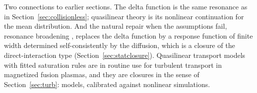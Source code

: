 Two connections to earlier sections. The delta function is the same
resonance as in Section~\ref{sec:collisionless}; quasilinear theory is its
nonlinear continuation for the mean distribution. And the natural repair
when the assumptions fail, resonance broadening \cite{Dupree66}, replaces
the delta function by a response function of finite width determined
self-consistently by the diffusion, which is a closure of the
direct-interaction type (Section~\ref{sec:statclosure}). Quasilinear
transport models with fitted saturation rules are in routine use for
turbulent transport in magnetized fusion plasmas, and they are closures in
the sense of Section~\ref{sec:turb}: models, calibrated against nonlinear
simulations.
